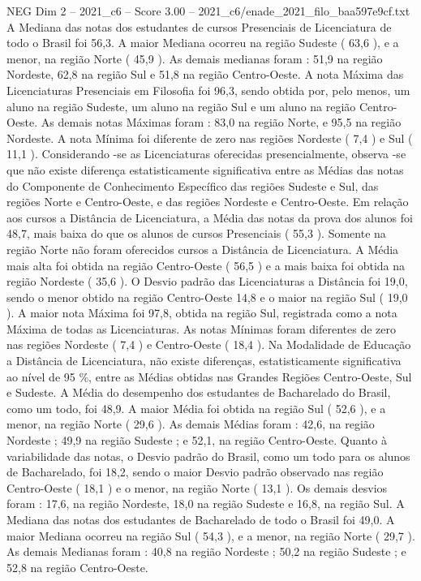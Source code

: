 \begin{textsample}{NEG Dim 2 – 2021\_c6 – Score 3.00 – 2021\_c6/enade\_2021\_filo\_baa597e9cf.txt}
A Mediana das notas dos estudantes de cursos Presenciais de Licenciatura de todo o Brasil foi 56,3.
A maior Mediana ocorreu na região Sudeste ( 63,6 ), e a menor, na região Norte ( 45,9 ).
As demais medianas foram : 51,9 na região Nordeste, 62,8 na região Sul e 51,8 na região Centro-Oeste.
A nota Máxima das Licenciaturas Presenciais em Filosofia foi 96,3, sendo obtida por, pelo menos, um aluno na região Sudeste, um aluno na região Sul e um aluno na região Centro-Oeste.
As demais notas Máximas foram : 83,0 na região Norte, e 95,5 na região Nordeste.
A nota Mínima foi diferente de zero nas regiões Nordeste ( 7,4 ) e Sul ( 11,1 ).
Considerando -se as Licenciaturas oferecidas presencialmente, observa -se que não existe diferença estatisticamente significativa entre as Médias das notas do Componente de Conhecimento Específico das regiões Sudeste e Sul, das regiões Norte e Centro-Oeste, e das regiões Nordeste e Centro-Oeste.
Em relação aos cursos a Distância de Licenciatura, a Média das notas da prova dos alunos foi 48,7, mais baixa do que os alunos de cursos Presenciais ( 55,3 ).
Somente na região Norte não foram oferecidos cursos a Distância de Licenciatura.
A Média mais alta foi obtida na região Centro-Oeste ( 56,5 ) e a mais baixa foi obtida na região Nordeste ( 35,6 ).
O Desvio padrão das Licenciaturas a Distância foi 19,0, sendo o menor obtido na região Centro-Oeste 14,8 e o maior na região Sul ( 19,0 ).
A maior nota Máxima foi 97,8, obtida na região Sul, registrada como a nota Máxima de todas as Licenciaturas.
As notas Mínimas foram diferentes de zero nas regiões Nordeste ( 7,4 ) e Centro-Oeste ( 18,4 ).
Na Modalidade de Educação a Distância de Licenciatura, não existe diferenças, estatisticamente significativa ao nível de 95 \%, entre as Médias obtidas nas Grandes Regiões Centro-Oeste, Sul e Sudeste.
A Média do desempenho dos estudantes de Bacharelado do Brasil, como um todo, foi 48,9.
A maior Média foi obtida na região Sul ( 52,6 ), e a menor, na região Norte ( 29,6 ).
As demais Médias foram : 42,6, na região Nordeste ; 49,9 na região Sudeste ; e 52,1, na região Centro-Oeste.
Quanto à variabilidade das notas, o Desvio padrão do Brasil, como um todo para os alunos de Bacharelado, foi 18,2, sendo o maior Desvio padrão observado nas região Centro-Oeste ( 18,1 ) e o menor, na região Norte ( 13,1 ).
Os demais desvios foram : 17,6, na região Nordeste, 18,0 na região Sudeste e 16,8, na região Sul.
A Mediana das notas dos estudantes de Bacharelado de todo o Brasil foi 49,0.
A maior Mediana ocorreu na região Sul ( 54,3 ), e a menor, na região Norte ( 29,7 ).
As demais Medianas foram : 40,8 na região Nordeste ; 50,2 na região Sudeste ; e 52,8 na região Centro-Oeste.

\end{textsample}
